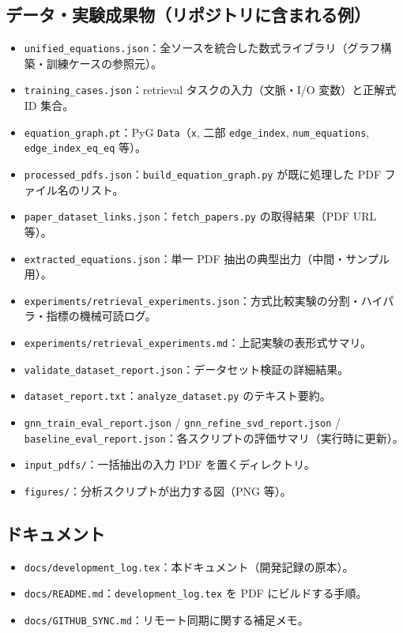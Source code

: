 \documentclass[11pt,a4paper]{jsarticle}
\begin{document}
\subsection{データ・実験成果物（リポジトリに含まれる例）}
\begin{itemize}[nosep]
  \item \texttt{unified\_equations.json}：全ソースを統合した数式ライブラリ（グラフ構築・訓練ケースの参照元）。
  \item \texttt{training\_cases.json}：retrieval タスクの入力（文脈・I/O 変数）と正解式 ID 集合。
  \item \texttt{equation\_graph.pt}：PyG \texttt{Data}（\texttt{x}, 二部 \texttt{edge\_index}, \texttt{num\_equations}, \texttt{edge\_index\_eq\_eq} 等）。
  \item \texttt{processed\_pdfs.json}：\texttt{build\_equation\_graph.py} が既に処理した PDF ファイル名のリスト。
  \item \texttt{paper\_dataset\_links.json}：\texttt{fetch\_papers.py} の取得結果（PDF URL 等）。
  \item \texttt{extracted\_equations.json}：単一 PDF 抽出の典型出力（中間・サンプル用）。
  \item \texttt{experiments/retrieval\_experiments.json}：方式比較実験の分割・ハイパラ・指標の機械可読ログ。
  \item \texttt{experiments/retrieval\_experiments.md}：上記実験の表形式サマリ。
  \item \texttt{validate\_dataset\_report.json}：データセット検証の詳細結果。
  \item \texttt{dataset\_report.txt}：\texttt{analyze\_dataset.py} のテキスト要約。
  \item \texttt{gnn\_train\_eval\_report.json} / \texttt{gnn\_refine\_svd\_report.json} / \texttt{baseline\_eval\_report.json}：各スクリプトの評価サマリ（実行時に更新）。
  \item \texttt{input\_pdfs/}：一括抽出の入力 PDF を置くディレクトリ。
  \item \texttt{figures/}：分析スクリプトが出力する図（PNG 等）。
\end{itemize}

\subsection{ドキュメント}
\begin{itemize}[nosep]
  \item \texttt{docs/development\_log.tex}：本ドキュメント（開発記録の原本）。
  \item \texttt{docs/README.md}：\texttt{development\_log.tex} を PDF にビルドする手順。
  \item \texttt{docs/GITHUB\_SYNC.md}：リモート同期に関する補足メモ。
\end{itemize}
\end{document}
